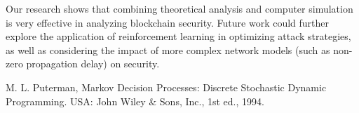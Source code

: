 \documentclass[12pt,a4paper]{article}
\begin{document}
Our research shows that combining theoretical analysis and computer simulation is very effective in analyzing blockchain security. Future work could further explore the application of reinforcement learning in optimizing attack strategies, as well as considering the impact of more complex network models (such as non-zero propagation delay) on security.

\begin{thebibliography}{9}
M. L. Puterman, Markov Decision Processes: Discrete Stochastic Dynamic Programming. USA: John Wiley \& Sons, Inc., 1st ed., 1994.
\end{thebibliography}
\end{document}
